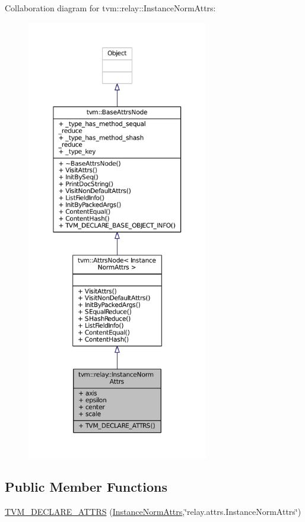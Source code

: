 Collaboration diagram for tvm\+:\+:relay\+:\+:Instance\+Norm\+Attrs\+:
\nopagebreak
\begin{figure}[H]
\begin{center}
\leavevmode
\includegraphics[height=550pt]{structtvm_1_1relay_1_1InstanceNormAttrs__coll__graph}
\end{center}
\end{figure}
\subsection*{Public Member Functions}
\begin{DoxyCompactItemize}
\item 
\hyperlink{structtvm_1_1relay_1_1InstanceNormAttrs_ac544bd1cae7f0be21c013dd64a4637a3}{T\+V\+M\+\_\+\+D\+E\+C\+L\+A\+R\+E\+\_\+\+A\+T\+T\+RS} (\hyperlink{structtvm_1_1relay_1_1InstanceNormAttrs}{Instance\+Norm\+Attrs},\char`\"{}relay.\+attrs.\+Instance\+Norm\+Attrs\char`\"{})
\end{DoxyCompactItemize}
